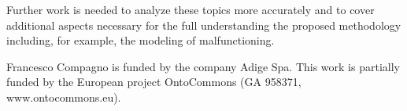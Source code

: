 \documentclass[
]{ceurart}
\begin{document}
Further work is needed to analyze these topics more accurately and to cover additional aspects necessary for the full understanding the proposed methodology including, for example, the modeling of malfunctioning.

\acknowledgments

Francesco Compagno is funded by the company Adige Spa. This work is partially funded by the European project
OntoCommons (GA 958371, www.ontocommons.eu).




\end{document}

